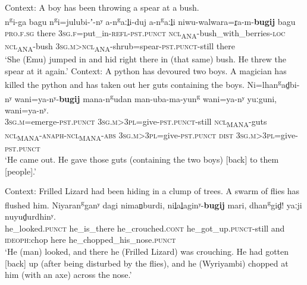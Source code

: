 \begin{exe}
	\ex \label{exAppendixWubuyIterative}
	Context: A boy has been throwing a spear at a bush.\\
	\gll n\textsuperscript{g}i-ga bagu n\textsuperscript{g}i=julubi-ʼ-nʸ a-n\textsuperscript{g}aːl̠i-duj a-n\textsuperscript{g}aːl̠i niwu-walwara=r̠a-m-\textbf{bugij} bagu\\
	\textsc{pro.}\textsc{f}.\textsc{sg} there 3\textsc{sg}.\textsc{f}=put\_in-\textsc{refl}-\textsc{pst}.\textsc{punct} \textsc{ncl}\textsubscript{ANA}-bush\_with\_berries-\textsc{loc} \textsc{ncl}\textsubscript{ANA}-bush 3\textsc{sg}.\textsc{m}>\textsc{ncl}\textsubscript{ANA}-shrub=spear-\textsc{pst}.\textsc{punct}-still there\\
	\glt \lq She (Emu) jumped in and hid right there in (that same) bush. He threw the spear at it again.' \parencite[30]{Heath1980}
	\ex Context: A python has devoured two boys. A magician has killed the python and has taken out her guts containing the boys.\label{appendixWubuyRestitutive1}
	\exi{}\gll 
	Ni=lhan\textsuperscript{g}ad̠bi-nʸ wani=ya-nʸ-\textbf{bugij} mana-n\textsuperscript{g}udan man-uba-ma-yun\textsuperscript{g} wani=ya-nʸ yuːguni, wani=ya-nʸ.\\
	3\textsc{sg}.\textsc{m}=emerge-\textsc{pst.punct} 3\textsc{sg}.\textsc{m}>3\textsc{pl}=give-\textsc{pst}.\textsc{punct}-still \textsc{ncl}\textsubscript{MANA}-guts \textsc{ncl}\textsubscript{MANA}-\textsc{anaph}-\textsc{ncl}\textsubscript{MANA}-\textsc{abs} 3\textsc{sg}.\textsc{m}>3\textsc{pl}=give-\textsc{pst}.\textsc{punct} \textsc{dist}  3\textsc{sg}.\textsc{m}>3\textsc{pl}=give-\textsc{pst}.\textsc{punct}\\
	\glt \lq He came out. He gave those guts (containing the two boys) [back] to them [people].' \parencite[23]{Heath1980}

	\ex Context: Frilled Lizard had been hiding in a clump of trees. A swarm of flies has flushed him.\label{appendixWubuyRestitutive2}
	\exi{} \gll Niyaran\textsuperscript{g}ganʸ dagi niman̠burdi, nil̠al̠aginʸ-\textbf{bugij} mari, dhan\textsuperscript{g}gid̠! yaːji nuyud̠urdhinʸ.\\
	he\_looked.\textsc{punct} he\_is\_there he\_crouched.\textsc{cont}  he\_got\_up.\textsc{punct}-still and \textsc{ideoph}:chop here he\_chopped\_his\_nose.\textsc{punct}\\
	\glt \lq He (man) looked, and there he (Frilled Lizard) was crouching. He had gotten [back] up (after being disturbed by the flies), and he (Wyriyambi) chopped at him (with an axe) across the nose.\rq{ }\parencite[113]{Heath1980}
\end{exe}

